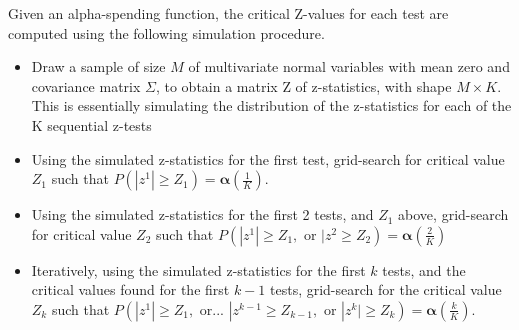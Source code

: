 \documentclass[final,3p,times]{elsarticle}
\begin{document}
Given an alpha-spending function, the critical Z-values for each test are computed using the following simulation procedure.
\begin{itemize}
\item Draw a sample of size $M$ of multivariate normal variables with mean zero and covariance matrix $\Sigma$, to obtain a matrix Z of z-statistics, with shape $M\times K$. This is essentially simulating the distribution of the z-statistics for each of the K sequential z-tests
\item Using the simulated z-statistics for the first test, grid-search for critical value $Z_1$ such that $P(|z^1|\geq Z_1) = \bm \alpha(\frac 1 K)$.
\item Using the simulated z-statistics for the first 2 tests, and $Z_1$ above, grid-search for critical value $Z_2$ such that $P(|z^1|\geq Z_1, \mbox{ or } |z^2\geq Z_2) = \bm \alpha(\frac 2 K)$
\item Iteratively, using the simulated z-statistics for the first $k$ tests, and the critical values found for the first $k-1$ tests, grid-search for the critical value $Z_k$ such that $P(|z^1|\geq Z_1, \mbox{ or... } |z^{k-1}\geq Z_{k-1}, \mbox{ or } |z^k| \geq Z_k) = \bm \alpha(\frac k K )$.
\end{itemize}













\end{document}
